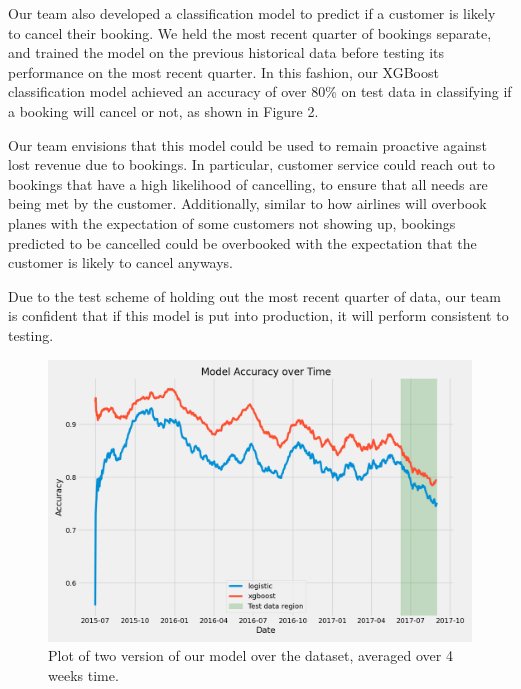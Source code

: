 \documentclass[12pt]{article}
\begin{document}
Our team also developed a classification model to predict if a customer is likely to cancel their booking. We held the most recent quarter of bookings separate, and trained the model on the previous historical data before testing its performance on the most recent quarter. In this fashion, our XGBoost classification model achieved an accuracy of over 80\% on test data in classifying if a booking will cancel or not, as shown in Figure 2.

Our team envisions that this model could be used to remain proactive against lost revenue due to bookings. In particular, customer service could reach out to bookings that have a high likelihood of cancelling, to ensure that all needs are being met by the customer. Additionally, similar to how airlines will overbook planes with the expectation of some customers not showing up, bookings predicted to be cancelled could be overbooked with the expectation that the customer is likely to cancel anyways.

Due to the test scheme of holding out the most recent quarter of data, our team is confident that if this model is put into production, it will perform consistent to testing.

\begin{figure}
    \centering
    \includegraphics[scale=0.45]{model_accuracy.png}
    \caption{Plot of two version of our model over the dataset, averaged over 4 weeks time.}
\end{figure}
\end{document}
